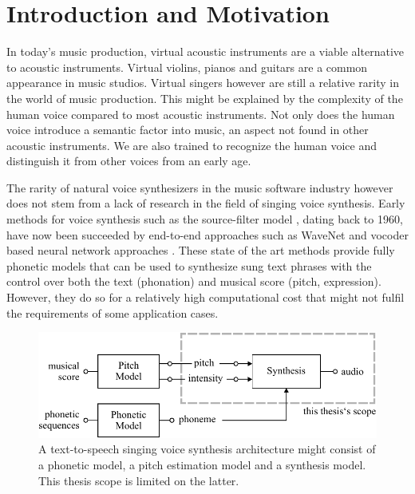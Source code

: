 \chapter{Introduction and Motivation}
\label{sec:Intro}


In today's music production, virtual acoustic instruments are a viable alternative to acoustic instruments. Virtual violins, pianos and guitars are a common appearance in music studios. Virtual singers however are still a relative rarity in the world of music production.  This might be explained by the complexity of the human voice compared to most acoustic instruments. Not only does the human voice introduce a semantic factor into music, an aspect not found in other acoustic instruments. We are also trained to recognize the human voice and distinguish it from other voices from an early age.

The rarity of natural voice synthesizers in the music software industry however does not stem from a lack of research in the field of singing voice synthesis. Early methods for voice synthesis such as the source-filter model \cite{fant_acoustic_1960}, dating back to 1960, have now been succeeded by end-to-end approaches such as WaveNet \cite{oord_wavenet:_2016} and vocoder based neural network approaches \cite{chandna_wgansing:_2019}\cite{blaauw_neural_2017}. These state of the art methods provide fully phonetic models that can be used to synthesize sung text phrases with the control over both the text (phonation) and musical score (pitch, expression). However, they do so for a relatively high computational cost that might not fulfil the requirements of some application cases. 

\begin{figure}[H]
    \centering
    \includegraphics{Graphics/004_thesis_scope.pdf}
    \caption{A text-to-speech singing voice synthesis architecture might consist of a phonetic model, a pitch estimation model and a synthesis model. This thesis scope is limited on the latter.}
    \label{fig:thesis_architecture_scope}
\end{figure}


